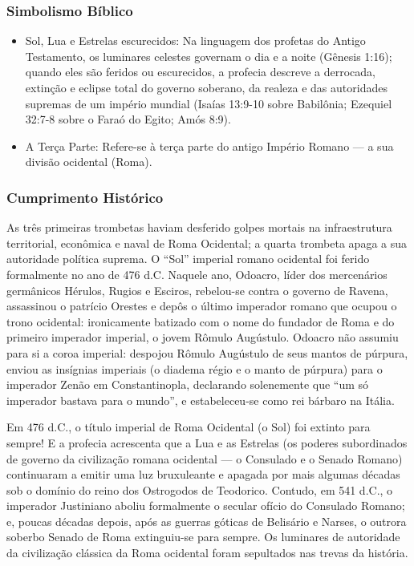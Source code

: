 \documentclass[11pt,a4paper,openany]{book}
\begin{document}
\subsubsection*{Simbolismo Bíblico}
\begin{itemize}
  \item Sol, Lua e Estrelas escurecidos: Na linguagem dos profetas do Antigo Testamento, os luminares celestes governam o dia e a noite (Gênesis 1:16); quando eles são feridos ou escurecidos, a profecia descreve a derrocada, extinção e eclipse total do governo soberano, da realeza e das autoridades supremas de um império mundial (Isaías 13:9-10 sobre Babilônia; Ezequiel 32:7-8 sobre o Faraó do Egito; Amós 8:9).
  \item A Terça Parte: Refere-se à terça parte do antigo Império Romano — a sua divisão ocidental (Roma).
\end{itemize}



\subsubsection*{Cumprimento Histórico}
As três primeiras trombetas haviam desferido golpes mortais na infraestrutura territorial, econômica e naval de Roma Ocidental; a quarta trombeta apaga a sua autoridade política suprema.
O ``Sol'' imperial romano ocidental foi ferido formalmente no ano de 476 d.C. Naquele ano, Odoacro, líder dos mercenários germânicos Hérulos, Rugios e Esciros, rebelou-se contra o governo de Ravena, assassinou o patrício Orestes e depôs o último imperador romano que ocupou o trono ocidental: ironicamente batizado com o nome do fundador de Roma e do primeiro imperador imperial, o jovem Rômulo Augústulo. Odoacro não assumiu para si a coroa imperial: despojou Rômulo Augústulo de seus mantos de púrpura, enviou as insígnias imperiais (o diadema régio e o manto de púrpura) para o imperador Zenão em Constantinopla, declarando solenemente que ``um só imperador bastava para o mundo'', e estabeleceu-se como rei bárbaro na Itália.

Em 476 d.C., o título imperial de Roma Ocidental (o Sol) foi extinto para sempre!
E a profecia acrescenta que a Lua e as Estrelas (os poderes subordinados de governo da civilização romana ocidental — o Consulado e o Senado Romano) continuaram a emitir uma luz bruxuleante e apagada por mais algumas décadas sob o domínio do reino dos Ostrogodos de Teodorico. Contudo, em 541 d.C., o imperador Justiniano aboliu formalmente o secular ofício do Consulado Romano; e, poucas décadas depois, após as guerras góticas de Belisário e Narses, o outrora soberbo Senado de Roma extinguiu-se para sempre. Os luminares de autoridade da civilização clássica da Roma ocidental foram sepultados nas trevas da história.
\end{document}
